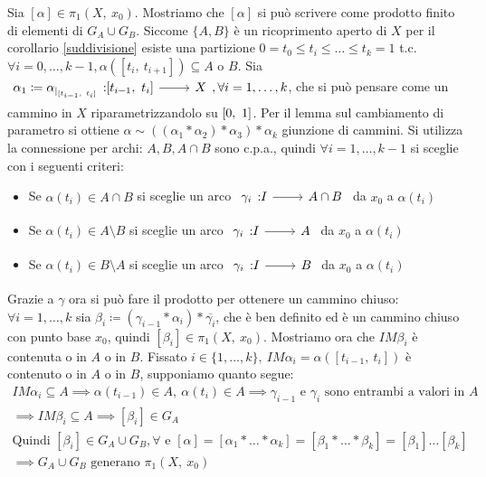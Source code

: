 \begin{demonstration}
	Sia $[\alpha]\in\pi_1(X,\ x_0)$. Mostriamo che $[\alpha]$ si può scrivere come prodotto finito di elementi di $G_A\cup G_B$.\newline
	Siccome $\{A,B\}$ è un ricoprimento aperto di $X$ per il corollario \ref{suddivisione} esiste una partizione $0=t_0\leq t_i\leq\dots\leq t_k=1$ t.c. $\forall i=0,\dots,k-1, \alpha([t_i,\ t_{i+1}]) \subseteq A$ o $B$. \newline 
	Sia $\funz {\alpha_1\coloneqq \alpha_{|_{[t_{i-1},\ t_i]}}} {[t_{i-1},\ t_i]} X, \forall i=1,\dots,k$, che si può pensare come un cammino in $X$ riparametrizzandolo su $\left[0,\ 1\right]$. Per il lemma sul cambiamento di parametro si ottiene $\alpha\sim \left( (\alpha_1 \ast \alpha_2)\ast \alpha_3 \right)\ast \alpha_k$ giunzione di cammini. Si utilizza la connessione per archi: $A,B,A\cap B$ sono c.p.a., quindi $\forall i=1,\dots,k-1$ si sceglie con i seguenti criteri:
		\begin{itemize}
			\item Se $\alpha(t_i)\in A\cap B$ si sceglie un arco $\funz {\gamma_i} I {A\cap B}$ da $x_0$ a $\alpha(t_i)$
			\item Se $\alpha(t_i)\in A\setminus B$ si sceglie un arco $\funz {\gamma_i} I {A}$ da $x_0$ a $\alpha(t_i)$
			\item Se $\alpha(t_i)\in B\setminus A$ si sceglie un arco $\funz {\gamma_i} I {B}$ da $x_0$ a $\alpha(t_i)$
		\end{itemize}
	Grazie a $\gamma$ ora si può fare il prodotto per ottenere un cammino chiuso: $\forall i=1,\dots,k$ sia $\beta_i\coloneqq (\gamma_{i-1}\ast \alpha_i)\ast\overline{\gamma_i}$, che è ben definito ed è un cammino chiuso con punto base $x_0$, quindi $[\beta_i]\in \pi_1(X,\ x_0)$. Mostriamo ora che $IM \beta_i$ è contenuta o in $A$ o in $B$. Fissato $i\in\{1,\dots,k\}, \ IM\alpha_i=\alpha([t_{i-1},\ t_i])$ è contenuto o in $A$ o in $B$, supponiamo quanto segue:
		\begin{gather*}
			IM\alpha_i \subseteq A \implies \alpha(t_{i-1})\in A,\ \alpha(t_i)\in A \implies \gamma_{i-1} \text{ e } \gamma_i \text{ sono entrambi a valori in }A \\ 
			\implies IM\beta_i \subseteq A \implies [\beta_i]\in G_A\\  
			\text{Quindi }[\beta_i]\in G_A\cup G_B, \forall \text{ e } [\alpha]=[\alpha_1 \ast \dots \ast\alpha_k]=[\beta_1\ast\dots\ast\beta_k]=[\beta_1]\dots [\beta_k]\\
			\implies G_A\cup G_B \text{ generano } \pi_1(X,\ x_0)
		\end{gather*}
\end{demonstration}
